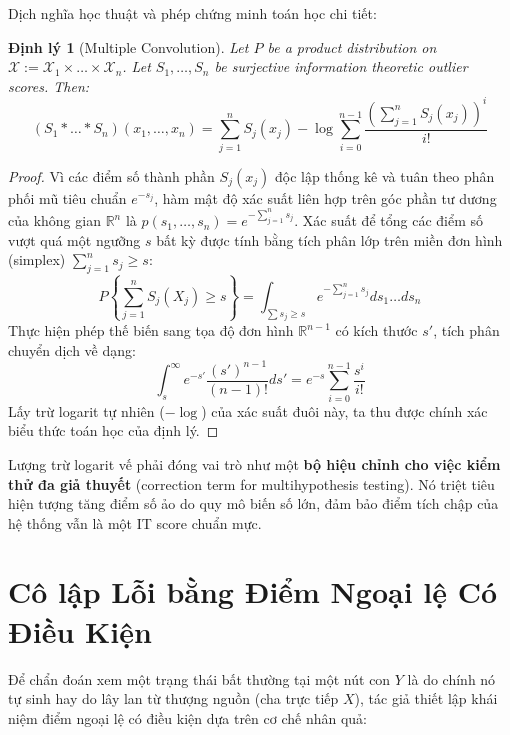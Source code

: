 \documentclass[11pt,a4paper]{article}
\newtheorem{theorem}{Định lý}
\begin{document}
Dịch nghĩa học thuật và phép chứng minh toán học chi tiết:
\begin{theorem}[Multiple Convolution]
Let $P$ be a product distribution on $\mathcal{X} := \mathcal{X}_1 \times \dots \times \mathcal{X}_n$. Let $S_1, \dots, S_n$ be surjective information theoretic outlier scores. Then:
\begin{equation}
(S_1 * \dots * S_n)(x_1, \dots, x_n) = \sum_{j=1}^n S_j(x_j) - \log \sum_{i=0}^{n-1} \frac{\left(\sum_{j=1}^n S_j(x_j)\right)^i}{i!}
\end{equation}
\end{theorem}

\begin{proof}
Vì các điểm số thành phần $S_j(x_j)$ độc lập thống kê và tuân theo phân phối mũ tiêu chuẩn $e^{-s_j}$, hàm mật độ xác suất liên hợp trên góc phần tư dương của không gian $\mathbb{R}^n$ là $p(s_1, \dots, s_n) = e^{-\sum_{j=1}^n s_j}$. Xác suất để tổng các điểm số vượt quá một ngưỡng $s$ bất kỳ được tính bằng tích phân lớp trên miền đơn hình (simplex) $\sum_{j=1}^n s_j \ge s$:
\begin{equation}
P\left\{\sum_{j=1}^n S_j(X_j) \ge s\right\} = \int_{\sum s_j \ge s} e^{-\sum_{j=1}^n s_j} ds_1 \dots ds_n
\end{equation}
Thực hiện phép thế biến sang tọa độ đơn hình $\mathbb{R}^{n-1}$ có kích thước $s'$, tích phân chuyển dịch về dạng:
\begin{equation}
\int_s^{\infty} e^{-s'} \frac{(s')^{n-1}}{(n-1)!} ds' = e^{-s} \sum_{i=0}^{n-1} \frac{s^i}{i!}
\end{equation}
Lấy trừ logarit tự nhiên ($-\log$) của xác suất đuôi này, ta thu được chính xác biểu thức toán học của định lý.
\end{proof}

Lượng trừ logarit vế phải đóng vai trò như một \textbf{bộ hiệu chỉnh cho việc kiểm thử đa giả thuyết} (correction term for multihypothesis testing). Nó triệt tiêu hiện tượng tăng điểm số ảo do quy mô biến số lớn, đảm bảo điểm tích chập của hệ thống vẫn là một IT score chuẩn mực.

\section{Cô lập Lỗi bằng Điểm Ngoại lệ Có Điều Kiện}

Để chẩn đoán xem một trạng thái bất thường tại một nút con $Y$ là do chính nó tự sinh hay do lây lan từ thượng nguồn (cha trực tiếp $X$), tác giả thiết lập khái niệm điểm ngoại lệ có điều kiện dựa trên cơ chế nhân quả:
\end{document}
